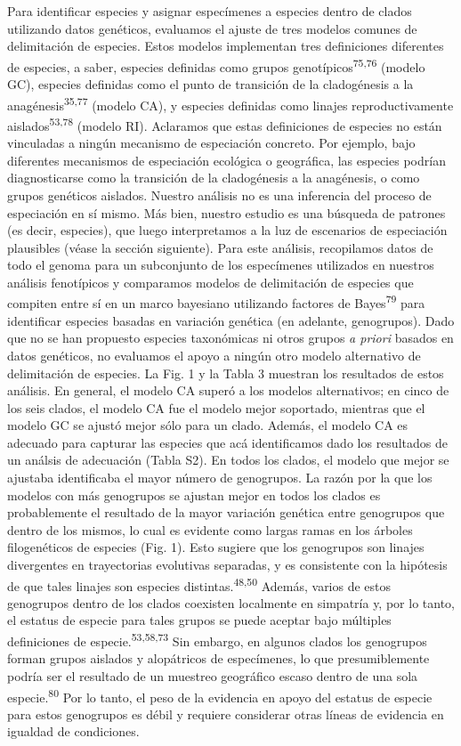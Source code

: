 \documentclass[
  11pt,
]{article}
\begin{document}
Para identificar especies y asignar especímenes a especies dentro de clados utilizando datos genéticos, evaluamos el ajuste de tres modelos comunes de delimitación de especies. Estos modelos implementan tres definiciones diferentes de especies, a saber, especies definidas como grupos genotípicos\textsuperscript{75,76} (modelo GC), especies definidas como el punto de transición de la cladogénesis a la anagénesis\textsuperscript{35,77} (modelo CA), y especies definidas como linajes reproductivamente aislados\textsuperscript{53,78} (modelo RI). Aclaramos que estas definiciones de especies no están vinculadas a ningún mecanismo de especiación concreto. Por ejemplo, bajo diferentes mecanismos de especiación ecológica o geográfica, las especies podrían diagnosticarse como la transición de la cladogénesis a la anagénesis, o como grupos genéticos aislados. Nuestro análisis no es una inferencia del proceso de especiación en sí mismo. Más bien, nuestro estudio es una búsqueda de patrones (es decir, especies), que luego interpretamos a la luz de escenarios de especiación plausibles (véase la sección siguiente). Para este análisis, recopilamos datos de todo el genoma para un subconjunto de los especímenes utilizados en nuestros análisis fenotípicos y comparamos modelos de delimitación de especies que compiten entre sí en un marco bayesiano utilizando factores de Bayes\textsuperscript{79} para identificar especies basadas en variación genética (en adelante, genogrupos). Dado que no se han propuesto especies taxonómicas ni otros grupos \emph{a priori} basados en datos genéticos, no evaluamos el apoyo a ningún otro modelo alternativo de delimitación de especies. La Fig. 1 y la Tabla 3 muestran los resultados de estos análisis. En general, el modelo CA superó a los modelos alternativos; en cinco de los seis clados, el modelo CA fue el modelo mejor soportado, mientras que el modelo GC se ajustó mejor sólo para un clado. Además, el modelo CA es adecuado para capturar las especies que acá identificamos dado los resultados de un análsis de adecuación (Tabla S2). En todos los clados, el modelo que mejor se ajustaba identificaba el mayor número de genogrupos. La razón por la que los modelos con más genogrupos se ajustan mejor en todos los clados es probablemente el resultado de la mayor variación genética entre genogrupos que dentro de los mismos, lo cual es evidente como largas ramas en los árboles filogenéticos de especies (Fig. 1). Esto sugiere que los genogrupos son linajes divergentes en trayectorias evolutivas separadas, y es consistente con la hipótesis de que tales linajes son especies distintas.\textsuperscript{48,50} Además, varios de estos genogrupos dentro de los clados coexisten localmente en simpatría y, por lo tanto, el estatus de especie para tales grupos se puede aceptar bajo múltiples definiciones de especie.\textsuperscript{53,58,73} Sin embargo, en algunos clados los genogrupos forman grupos aislados y alopátricos de especímenes, lo que presumiblemente podría ser el resultado de un muestreo geográfico escaso dentro de una sola especie.\textsuperscript{80} Por lo tanto, el peso de la evidencia en apoyo del estatus de especie para estos genogrupos es débil y requiere considerar otras líneas de evidencia en igualdad de condiciones.
\end{document}
